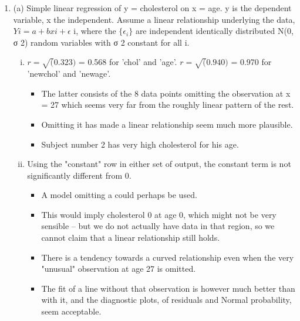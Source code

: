 \documentclass[a4paper,12pt]{article}
\begin{document}
\begin{enumerate}
\newpage

\begin{framed}
(ii) (a) The following two pages (pages 9 and 10) show edited Minitab
analysis of the relationship between cholesterol level and age for a
sample of 9 males. Name the statistical model which is being fitted,
identify the independent and dependent variables and state the usual
assumptions made about the data.
(b) Use the output to calculate the correlation between "chol" and "age",
and the correlation between "newchol" and "newage", and give a
reason for the difference between these two correlations.
(c) Use the output to assess whether the constant term in the model is
statistically significant. What would omission of the constant term
imply for a new-born infant?
(d) Which of the ("chol", "age") and ("newchol", "newage") analyses do
you prefer as a summary of the data, and why?
(12)

\end{framed}
\item  (a) Simple linear regression of y = cholesterol on x = age. y is the
dependent variable, x the independent. Assume a linear relationship
underlying the data, $Yi = a + bxi + \epsilon$
i, where the $\{ \epsilon_i\}$
 are independent
identically distributed N(0, σ 2) random variables with σ 2 constant for
all i.
\begin{enumerate}[(i)]
\item $r = \sqrt(0.323)$ = 0.568 for 'chol' and 'age'.
$r = \sqrt(0.940)$ = 0.970 for 'newchol' and 'newage'.
\begin{itemize}
\item The latter consists of the 8 data points omitting the observation at
x = 27 which seems very far from the roughly linear pattern of the rest.
\item Omitting it has made a linear relationship seem much more plausible.
\item Subject number 2 has very high cholesterol for his age.
\end{itemize}


\item Using the "constant" row in either set of output, the constant term is
not significantly different from 0. 
\begin{itemize}
    \item A model omitting a could perhaps
be used.
   \item This would imply cholesterol 0 at age 0, which might not be very
sensible – but we do not actually have data in that region, so we
cannot claim that a linear relationship still holds.
   \item There is a tendency towards a curved relationship even when the very
"unusual" observation at age 27 is omitted. 
   \item The fit of a line without
that observation is however much better than with it, and the
diagnostic plots, of residuals and Normal probability, seem acceptable.
\end{itemize}

\end{enumerate}

\end{enumerate}
\end{document}
